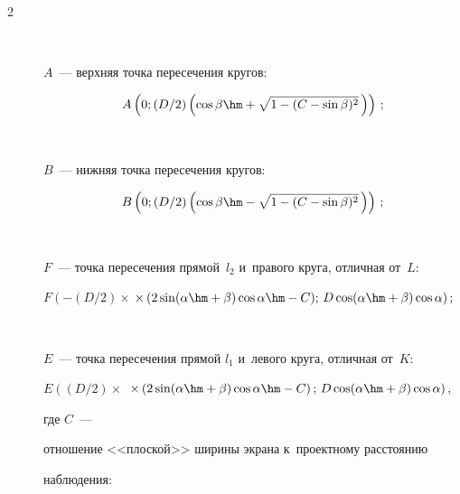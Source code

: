 \begin{multicols}{2}
\begin{description}
\item[\,]

$A$~--- верхняя точка пересечения кругов:





\noindent

$$

A\left( 0;({D}/{2})\left(\cos\beta\hm+\sqrt{1-(C-\sin\beta)^2}\,\right)\right)\,;

$$



\vspace*{-4pt}



\item[\,]

$B$~--- нижняя точка пересечения кругов:



\vspace*{-2pt}



\noindent

$$

B\left( 0;({D}/{2})\left( \cos\beta \hm-\sqrt{1-(C-\sin\beta)^2}\,\right)\right)\,;

$$



\vspace*{-2pt}



\item[\,]

$F$~--- точка пересечения прямой~$l_2$ и~правого круга, отличная от~$L$:

$F\left( -({D}/{2})\times\right.$\linebreak $\left.\times\left(2\sin(\alpha\hm+\beta\right)\cos\alpha\hm-

C);\,D\cos(\alpha\hm+\beta)\cos\alpha\right);$

\item[\,]

$E$~--- точка пересечения прямой $l_1$ и~левого круга, отличная от~$K$:

$E\left( ({D}/{2})\times\right.$ $\left.\times\left(2\sin(\alpha\hm+\beta)\cos\alpha\hm -

C\right);\,D\cos(\alpha\hm+\beta)\cos\alpha\right),$

где $C$~---

отношение <<плоской>> ширины экрана к~проектному расстоянию

наблюдения:




\end{description}
\end{multicols}
